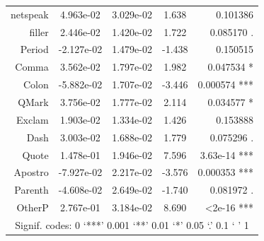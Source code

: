 \documentclass[bsc,frontabs,twoside,singlespacing,parskip,deptreport]{infthesis}
\begin{document}
\begin{table}[p]
{\begin{tabular}{rcccr}
netspeak    & 4.963e-02  & 3.029e-02  & 1.638   & 0.101386                            \\
filler      & 2.446e-02  & 1.420e-02  & 1.722   & 0.085170 .                          \\
Period      & -2.127e-02 & 1.479e-02  & -1.438  & 0.150515                            \\
Comma       & 3.562e-02  & 1.797e-02  & 1.982   & 0.047534 *                          \\
Colon       & -5.882e-02 & 1.707e-02  & -3.446  & 0.000574 ***                        \\
QMark       & 3.756e-02  & 1.777e-02  & 2.114   & 0.034577 *                          \\
Exclam      & 1.903e-02  & 1.334e-02  & 1.426   & 0.153888                            \\
Dash        & 3.003e-02  & 1.688e-02  & 1.779   & 0.075296 .                          \\
Quote       & 1.478e-01  & 1.946e-02  & 7.596   & 3.63e-14 ***                        \\
Apostro     & -7.927e-02 & 2.217e-02  & -3.576  & 0.000353 ***                        \\
Parenth     & -4.608e-02 & 2.649e-02  & -1.740  & 0.081972 .                          \\
OtherP      & 2.767e-01  & 3.184e-02  & 8.690   & \textless 2e-16 ***                 \\ \hline
\multicolumn{5}{c}{Signif. codes:  0 ‘***’ 0.001 ‘**’ 0.01 ‘*’ 0.05 ‘.’ 0.1 ‘ ’ 1}    \\ \hline
\end{tabular}%
}
\end{table}
\end{document}
